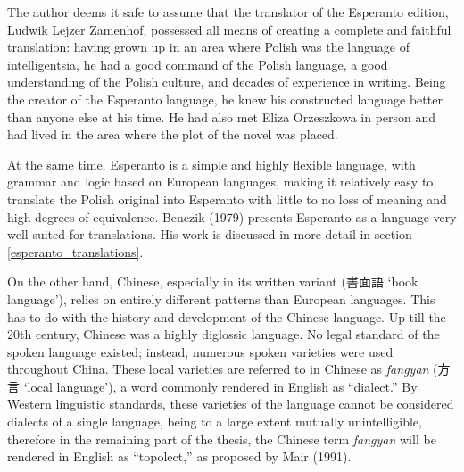 The author deems it safe to assume that the translator of the Esperanto edition, Ludwik Lejzer Zamenhof, possessed all means of creating a complete and faithful translation: having grown up in an area where Polish was the language of intelligentsia, he had a good command of the Polish language, a good understanding of the Polish culture, and decades of experience in writing.
Being the creator of the Esperanto language, he knew his constructed language better than anyone else at his time.
He had also met Eliza Orzeszkowa in person and had lived in the area where the plot of the novel was placed.

At the same time, Esperanto is a simple and highly flexible language, with grammar and logic based on European languages, making it relatively easy to translate the Polish original into Esperanto with little to no loss of meaning and high degrees of equivalence.
Benczik (1979) presents Esperanto as a language very well-suited for translations.
His work is discussed in more detail in section \ref{esperanto_translations}.

On the other hand, Chinese, especially in its written variant (書面語  `book language'), relies on entirely different patterns than European languages.
This has to do with the history and development of the Chinese language.
Up till the 20th century, Chinese was a highly diglossic language.
No legal standard of the spoken language existed; instead, numerous spoken varieties were used throughout China.
These local varieties are referred to in Chinese as \textit{fangyan} (方言  `local language'), a word commonly rendered in English as ``dialect.''
By Western linguistic standards, these varieties of the language cannot be considered dialects of a single language, being to a large extent mutually unintelligible, therefore in the remaining part of the thesis, the Chinese term \textit{fangyan} will be rendered in English as ``topolect,'' as proposed by Mair (1991).

